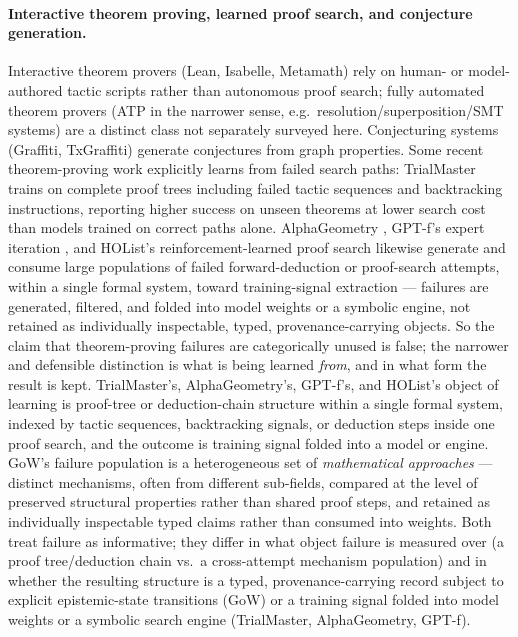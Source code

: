 \documentclass[11pt]{article}
\theoremstyle{gowthm}
\theoremstyle{gowplain}
\begin{document}
\paragraph{Interactive theorem proving, learned proof search, and conjecture generation.}
Interactive theorem provers (Lean, Isabelle, Metamath)
\citep{harrison2014history} rely on human- or model-authored tactic scripts
rather than autonomous proof search; fully automated theorem provers (ATP in
the narrower sense, e.g.\ resolution/superposition/SMT systems) are a
distinct class not separately surveyed here. Conjecturing systems (Graffiti,
TxGraffiti) \citep{fajtlowicz1988graffiti}
generate conjectures from graph properties. Some recent theorem-proving work
explicitly
learns from failed search paths: TrialMaster \citep{an2024trialmaster} trains
on complete proof trees including failed tactic sequences and backtracking
instructions, reporting higher success on unseen theorems at lower search cost
than models trained on correct paths alone. AlphaGeometry \citep{trinh2024alphageometry},
GPT-f's expert iteration \citep{polu2020generative}, and HOList's
reinforcement-learned proof search \citep{bansal2019holist} likewise generate and
consume large populations of failed forward-deduction or proof-search
attempts, within a single formal system, toward training-signal extraction ---
failures are generated, filtered, and folded into model weights or a symbolic
engine, not retained as individually inspectable, typed, provenance-carrying
objects. So the claim that theorem-proving failures are
categorically unused is false; the narrower and defensible distinction is what
is being learned \emph{from}, and in what form the result is kept.
TrialMaster's, AlphaGeometry's, GPT-f's, and HOList's object of learning is proof-tree
or deduction-chain
structure within a single formal system, indexed by tactic sequences,
backtracking signals, or deduction steps inside one proof search, and the
outcome is training signal folded into a model or engine. GoW's failure population is a
heterogeneous set of \emph{mathematical approaches} --- distinct mechanisms,
often from different sub-fields, compared at the level of preserved structural
properties rather than shared proof steps, and retained as individually
inspectable typed claims rather than consumed into weights.
Both treat failure as informative;
they differ in what object failure is measured over (a proof tree/deduction
chain vs.\ a
cross-attempt mechanism population) and in whether the resulting structure is
a typed, provenance-carrying record subject to explicit epistemic-state
transitions (GoW) or a training signal folded into model weights or a symbolic
search engine (TrialMaster, AlphaGeometry, GPT-f).
\end{document}
